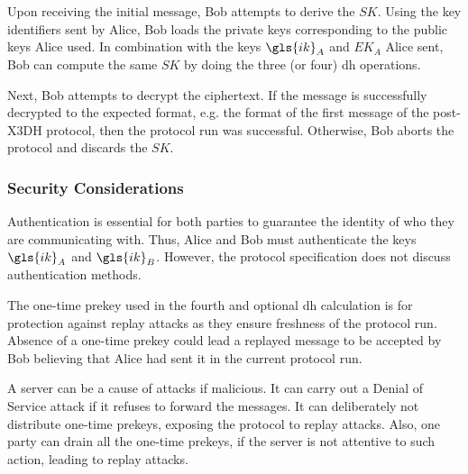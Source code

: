 Upon receiving the initial message, Bob attempts to derive the $ SK $.
Using the key identifiers sent by Alice, Bob loads the private keys corresponding to the public keys Alice used. In combination with the keys $ \gls{ik}_{A} $ and $ EK_{A} $ Alice sent, Bob can compute the same $ SK $ by doing the three (or four) \gls{dh} operations.
\par
Next, Bob attempts to decrypt the ciphertext. If the message is successfully decrypted to the expected format, e.g. the format of the first message of the post-X3DH protocol, then the protocol run was successful. Otherwise, Bob aborts the protocol and discards the $ SK $.

\subsubsection{Security Considerations}
Authentication is essential for both parties to guarantee the identity of who they are communicating with. Thus, Alice and Bob must authenticate the keys $ \gls{ik}_{A} $ and $ \gls{ik}_{B} $. However, the protocol specification does not discuss authentication methods.
\par
The one-time prekey used in the fourth and optional \gls{dh} calculation is for protection against replay attacks as they ensure freshness of the protocol run. Absence of a one-time prekey could lead a replayed message to be accepted by Bob believing that Alice had sent it in the current protocol run.
\par
A server can be a cause of attacks if malicious. It can carry out a Denial of Service attack if it refuses to forward the messages. It can deliberately not distribute one-time prekeys, exposing the protocol to replay attacks. Also, one party can drain all the one-time prekeys, if the server is not attentive to such action, leading to replay attacks.
